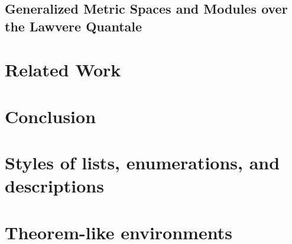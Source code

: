 \documentclass[a4paper,UKenglish,cleveref, autoref, thm-restate]{lipics-v2021}
\begin{document}
\subsection{Generalized Metric Spaces and Modules over the Lawvere Quantale}\label{section6}

\newpage



\section{Related Work}\label{section7}



\section{Conclusion}\label{section8}






\appendix

\section{Styles of lists, enumerations, and descriptions}\label{sec:itemStyles}


\section{Theorem-like environments}\label{sec:theorem-environments}
\end{document}
